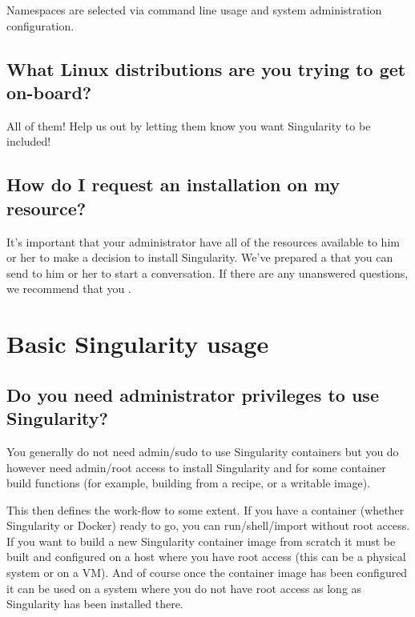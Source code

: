 \documentclass[letterpaper,10pt,english]{sphinxmanual}
\begin{document}
Namespaces are selected via command line usage and system administration configuration.


\subsection{What Linux distributions are you trying to get on-board?}
\label{\detokenize{faq:what-linux-distributions-are-you-trying-to-get-on-board}}
All of them! Help us out by letting them know you want Singularity to be included!


\subsection{How do I request an installation on my resource?}
\label{\detokenize{faq:how-do-i-request-an-installation-on-my-resource}}
It’s important that your administrator have all of the resources available to him or her to make a decision to install Singularity.
We’ve prepared a {\hyperref[\detokenize{installation:installation-request}]{}} that you can send to him or her to start a conversation. If there are any unanswered questions, we recommend
that you .


\section{Basic Singularity usage}
\label{\detokenize{faq:basic-singularity-usage}}

\subsection{Do you need administrator privileges to use Singularity?}
\label{\detokenize{faq:do-you-need-administrator-privileges-to-use-singularity}}
You generally do not need admin/sudo to use Singularity containers but you do however need admin/root access to install Singularity and for some
container build functions (for example, building from a recipe, or a writable image).

This then defines the work-flow to some extent. If you have a container (whether Singularity or Docker) ready to go, you can run/shell/import
without root access. If you want to build a new Singularity container image from scratch it must be built and configured on a host where you have root
access (this can be a physical system or on a VM). And of course once the container image has been configured it can be used on a system where you do not have root access as long as Singularity has been installed there.
\end{document}
